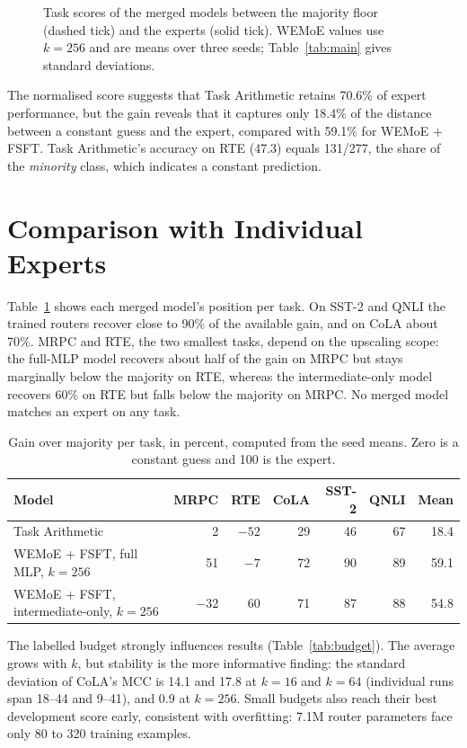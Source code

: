 \begin{figure}[htbp]
  \centering
  
  \caption{Task scores of the merged models between the majority floor (dashed tick) and the experts (solid tick). WEMoE values use $k=256$ and are means over three seeds; Table~\ref{tab:main} gives standard deviations.}
  \label{fig:per-task}
\end{figure}

The normalised score suggests that Task Arithmetic retains 70.6\% of expert performance, but the gain reveals that it captures only 18.4\% of the distance between a constant guess and the expert, compared with 59.1\% for WEMoE + FSFT. Task Arithmetic's accuracy on RTE (47.3) equals 131/277, the share of the \emph{minority} class, which indicates a constant prediction.

\section{Comparison with Individual Experts}

Table~\ref{tab:gain} shows each merged model's position per task. On SST-2 and QNLI the trained routers recover close to 90\% of the available gain, and on CoLA about 70\%. MRPC and RTE, the two smallest tasks, depend on the upscaling scope: the full-MLP model recovers about half of the gain on MRPC but stays marginally below the majority on RTE, whereas the intermediate-only model recovers 60\% on RTE but falls below the majority on MRPC. No merged model matches an expert on any task.

\begin{table}[htbp]
  \centering\tablestyle
  \caption{Gain over majority per task, in percent, computed from the seed means. Zero is a constant guess and 100 is the expert.}
  \label{tab:gain}
  \begin{tabular}{l r r r r r r}
    \toprule
    Model & MRPC & RTE & CoLA & SST-2 & QNLI & Mean\\
    \midrule
    Task Arithmetic & 2 & $-52$ & 29 & 46 & 67 & 18.4\\
    WEMoE + FSFT, full MLP, $k=256$ & 51 & $-7$ & 72 & 90 & 89 & 59.1\\
    WEMoE + FSFT, intermediate-only, $k=256$ & $-32$ & 60 & 71 & 87 & 88 & 54.8\\
    \bottomrule
  \end{tabular}
\end{table}

The labelled budget strongly influences results (Table~\ref{tab:budget}). The average grows with $k$, but stability is the more informative finding: the standard deviation of CoLA's MCC is 14.1 and 17.8 at $k=16$ and $k=64$ (individual runs span 18--44 and 9--41), and 0.9 at $k=256$. Small budgets also reach their best development score early, consistent with overfitting: 7.1M router parameters face only 80 to 320 training examples.

